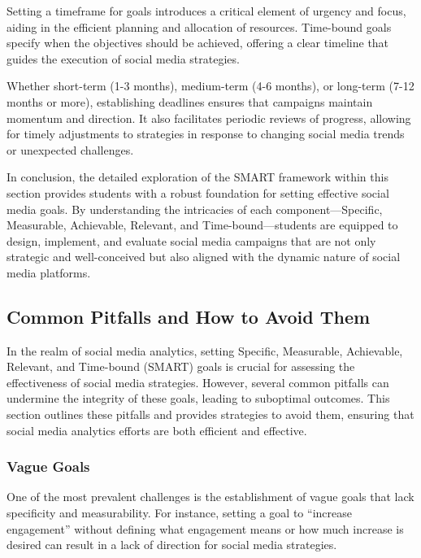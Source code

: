 \documentclass[
]{book}
\begin{document}
Setting a timeframe for goals introduces a critical element of urgency and focus, aiding in the efficient planning and allocation of resources. Time-bound goals specify when the objectives should be achieved, offering a clear timeline that guides the execution of social media strategies.

Whether short-term (1-3 months), medium-term (4-6 months), or long-term (7-12 months or more), establishing deadlines ensures that campaigns maintain momentum and direction. It also facilitates periodic reviews of progress, allowing for timely adjustments to strategies in response to changing social media trends or unexpected challenges.

In conclusion, the detailed exploration of the SMART framework within this section provides students with a robust foundation for setting effective social media goals. By understanding the intricacies of each component---Specific, Measurable, Achievable, Relevant, and Time-bound---students are equipped to design, implement, and evaluate social media campaigns that are not only strategic and well-conceived but also aligned with the dynamic nature of social media platforms.

\hypertarget{common-pitfalls-and-how-to-avoid-them}{%
\subsection*{Common Pitfalls and How to Avoid Them}\label{common-pitfalls-and-how-to-avoid-them}}

In the realm of social media analytics, setting Specific, Measurable, Achievable, Relevant, and Time-bound (SMART) goals is crucial for assessing the effectiveness of social media strategies. However, several common pitfalls can undermine the integrity of these goals, leading to suboptimal outcomes. This section outlines these pitfalls and provides strategies to avoid them, ensuring that social media analytics efforts are both efficient and effective.

\hypertarget{vague-goals}{%
\subsubsection*{Vague Goals}\label{vague-goals}}

One of the most prevalent challenges is the establishment of vague goals that lack specificity and measurability. For instance, setting a goal to ``increase engagement'' without defining what engagement means or how much increase is desired can result in a lack of direction for social media strategies.
\end{document}
